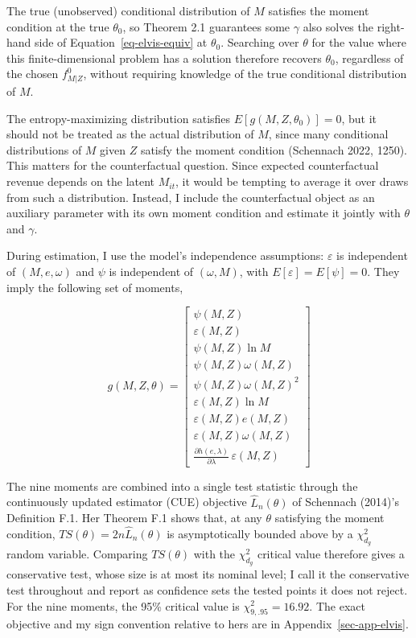 \documentclass[
  12pt,
  letterpaper,
  oneside,
  openany]{report}
\begin{document}
The true (unobserved) conditional distribution of \(M\) satisfies the
moment condition at the true \(\theta_0\), so Theorem 2.1 guarantees
some \(\gamma\) also solves the right-hand side of
Equation~\ref{eq-elvis-equiv} at \(\theta_0\). Searching over \(\theta\)
for the value where this finite-dimensional problem has a solution
therefore recovers \(\theta_0\), regardless of the chosen \(f^0_{M|Z}\),
without requiring knowledge of the true conditional distribution of
\(M\).

The entropy-maximizing distribution satisfies \(E[g(M,Z,\theta_0)]=0\),
but it should not be treated as the actual distribution of \(M\), since
many conditional distributions of \(M\) given \(Z\) satisfy the moment
condition (Schennach 2022, 1250). This matters for the counterfactual
question. Since expected counterfactual revenue depends on the latent
\(M_{it}\), it would be tempting to average it over draws from such a
distribution. Instead, I include the counterfactual object as an
auxiliary parameter with its own moment condition and estimate it
jointly with \(\theta\) and \(\gamma\).

During estimation, I use the model's independence assumptions:
\(\varepsilon\) is independent of \((M,e,\omega)\) and \(\psi\) is
independent of \((\omega,M)\), with \(E[\varepsilon]=E[\psi]=0\). They
imply the following set of moments,

\[
g(M,Z,\theta)=\begin{bmatrix}
\psi(M,Z) \\
\varepsilon(M,Z) \\
\psi(M,Z)\ln M \\
\psi(M,Z)\omega(M,Z) \\
\psi(M,Z)\omega(M,Z)^2 \\
\varepsilon(M,Z)\ln M \\
\varepsilon(M,Z) e(M,Z) \\
\varepsilon(M,Z)\omega(M,Z) \\
\frac{\partial h(e,\lambda)}{\partial\lambda}\,\varepsilon(M,Z)
\end{bmatrix}
\]

The nine moments are combined into a single test statistic through the
continuously updated estimator (CUE) objective \(\hat L_n(\theta)\) of
Schennach (2014)'s Definition F.1. Her Theorem F.1 shows that, at any
\(\theta\) satisfying the moment condition,
\(TS(\theta)=2n\hat L_n(\theta)\) is asymptotically bounded above by a
\(\chi^2_{d_g}\) random variable. Comparing \(TS(\theta)\) with the
\(\chi^2_{d_g}\) critical value therefore gives a conservative test,
whose size is at most its nominal level; I call it the conservative test
throughout and report as confidence sets the tested points it does not
reject. For the nine moments, the 95\% critical value is
\(\chi^2_{9,.95}=16.92\). The exact objective and my sign convention
relative to hers are in Appendix~\ref{sec-app-elvis}.
\end{document}
